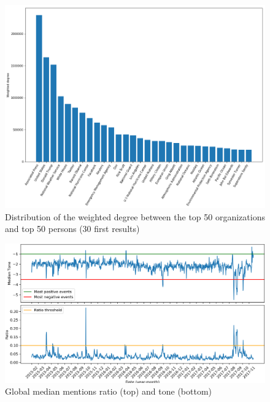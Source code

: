 \documentclass[a4paper]{article}
\begin{document}
\begin{figure}[h]
   \centering
    \includegraphics[scale=0.4]{weighted_degree_dist.png}
    \centering
    \caption{\label{weighted_degree} Distribution of the weighted degree between the top 50 organizations and top 50 persons (30 first results)}
\end{figure}

\begin{figure}[h]
   \centering
   \includegraphics[scale=0.5]{global_ratio_tone_plot.png}
    \caption{\label{time_evolu_wide} Global median mentions ratio (top) and tone (bottom)}
\end{figure}
\end{document}
